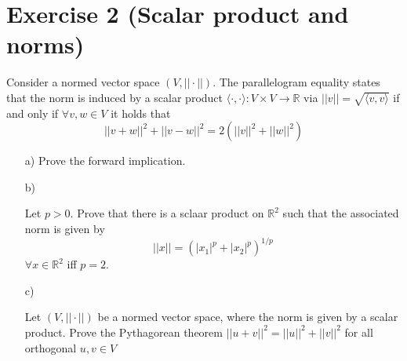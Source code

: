 \documentclass[10pt]{article}
\numberwithin{equation}{section}
\begin{document}
\section*{Exercise 2 (Scalar product and norms)}
Consider a normed vector space $(V, ||\cdot||)$. The parallelogram equality states that the norm is induced by a scalar product $\langle \cdot, \cdot \rangle: V \times V \rightarrow \mathbb{R}$ via $||v|| = \sqrt{\langle v, v \rangle}$ if and only if $\forall v, w \in V$ it holds that
$$ || v + w||^2 + ||v - w||^2 = 2(||v||^2 + ||w||^2)$$

\begin{enumerate}
\item[a)]{
    Prove the forward implication.
  }
\item[b)]{
    Let $p > 0$. Prove that there is a sclaar product on $\mathbb{R}^2$ such that the associated norm is given by 
$$||x|| = (|x_1|^p + |x_2|^p)^{1/p}$$
$\forall x \in \mathbb{R}^2$ iff $p =2$.

  }
\item[c)]{
    Let $(V, ||\cdot||)$ be a normed vector space, where the norm is given by a scalar product. Prove the Pythagorean theorem $||u + v||^2 = ||u||^2 + ||v||^2$ for all orthogonal $u,v \in V$

  }
\end{enumerate}
\end{document}
